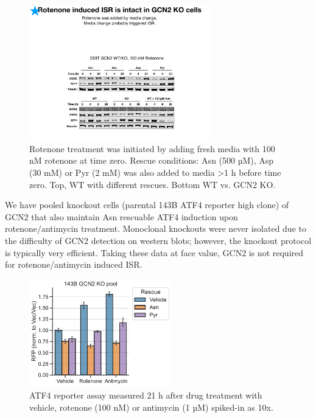 \begin{figure}[ht]
    \centering
    \includegraphics[width=0.70\textwidth]{figures/sapp/ISR/293T_GCN2_ISR.pdf}
    \caption[ATF4 post mito inhib. GCN2 KO, western]{
    Rotenone treatment was initiated by adding fresh media with 100 nM rotenone at time zero.
    Rescue conditions: Asn (500 µM), Asp (30 mM) or Pyr (2 mM) was also added to media >1 h before time zero.
    Top, WT with different rescues.
    Bottom WT vs. GCN2 KO.
    }
    \label{fig:sapp:ISR:293T_GCN2_ISR}
\end{figure}


\FloatBarrier
We have pooled knockout cells (parental 143B ATF4 reporter high clone) of GCN2 that also maintain Asn rescuable ATF4 induction upon rotenone/antimycin treatment.
Monoclonal knockouts were never isolated due to the difficulty of GCN2 detection on western blots; however, the knockout protocol is typically very efficient.
Taking these data at face value, GCN2 is not required for rotenone/antimycin induced ISR.

\begin{figure}[ht]
    \centering
    \includegraphics[width=0.55\textwidth]{figures/sapp/ISR/143B_GCN2_ISR.pdf}
    \caption[ATF4 post mito inhib. GCN2 KO, reporter]{
    ATF4 reporter assay measured 21 h after drug treatment with vehicle, rotenone (100 nM) or antimycin (1 µM) spiked-in as 10x.
    }
    \label{fig:sapp:ISR:143B_GCN2_ISR}
\end{figure}






